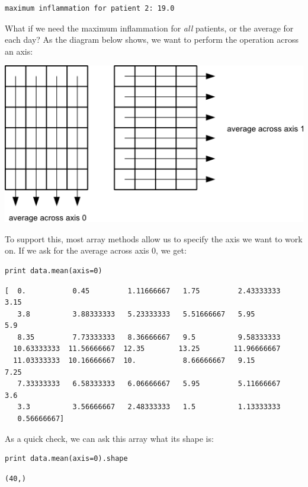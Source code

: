 \documentclass{book}
\begin{document}
\begin{verbatim}
maximum inflammation for patient 2: 19.0
\end{verbatim}

What if we need the maximum inflammation for \emph{all} patients, or the
average for each day? As the diagram below shows, we want to perform the
operation across an axis:

\includegraphics{novice/python/img/python-operations-across-axes.png}

To support this, most array methods allow us to specify the axis we want
to work on. If we ask for the average across axis 0, we get:

\begin{verbatim}
print data.mean(axis=0)
\end{verbatim}

\begin{verbatim}
[  0.           0.45         1.11666667   1.75         2.43333333   3.15
   3.8          3.88333333   5.23333333   5.51666667   5.95         5.9
   8.35         7.73333333   8.36666667   9.5          9.58333333
  10.63333333  11.56666667  12.35        13.25        11.96666667
  11.03333333  10.16666667  10.           8.66666667   9.15         7.25
   7.33333333   6.58333333   6.06666667   5.95         5.11666667   3.6
   3.3          3.56666667   2.48333333   1.5          1.13333333
   0.56666667]
\end{verbatim}

As a quick check, we can ask this array what its shape is:

\begin{verbatim}
print data.mean(axis=0).shape
\end{verbatim}

\begin{verbatim}
(40,)
\end{verbatim}
\end{document}
